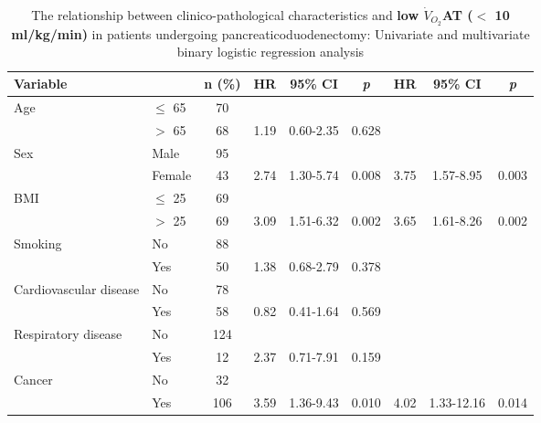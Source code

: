\begin{sidewaystable}[p]
	\caption{The relationship between clinico-pathological characteristics and \textbf{low $\dot{V}_{O_2}$AT ($<$ 10 ml/kg/min)} in patients undergoing pancreaticoduodenectomy: Univariate and multivariate binary logistic regression analysis}
	\label{table:cpet_oj_at_regression}
	\setlength{\tabcolsep}{9pt} %
	\centering
	\begin{tabular}{|l l c| c c c| c c c|}
		\hline
		Variable                &           & n (\%) & HR   & 95\% CI    & \textit{p} & HR   & 95\% CI    & \textit{p} \\ \hline
		Age                     & $\leq$ 65 & 70     &      &            &            &      &            &  \\
		                        & $>$ 65    & 68     & 1.19 & 0.60-2.35  & 0.628      &      &            &  \\
		Sex                     & Male      & 95     &      &            &            &      &            &  \\
		                        & Female    & 43     & 2.74 & 1.30-5.74  & 0.008      & 3.75 & 1.57-8.95  & 0.003      \\
		BMI                     & $\leq$ 25 & 69     &      &            &            &      &            &  \\
		                        & $>$ 25    & 69     & 3.09 & 1.51-6.32  & 0.002      & 3.65 & 1.61-8.26  & 0.002      \\
		Smoking                 & No        & 88     &      &            &            &      &            &  \\
		                        & Yes       & 50     & 1.38 & 0.68-2.79  & 0.378      &      &            &  \\
		Cardiovascular disease  & No        & 78     &      &            &            &      &            &  \\
		                        & Yes       & 58     & 0.82 & 0.41-1.64  & 0.569      &      &            &  \\
		Respiratory disease     & No        & 124    &      &            &            &      &            &  \\
		                        & Yes       & 12     & 2.37 & 0.71-7.91  & 0.159      &      &            &  \\
		Cancer                  & No        & 32     &      &            &            &      &            &  \\
		                        & Yes       & 106    & 3.59 & 1.36-9.43  & 0.010      & 4.02 & 1.33-12.16 & 0.014      \\

\end{tabular}
\end{sidewaystable}

